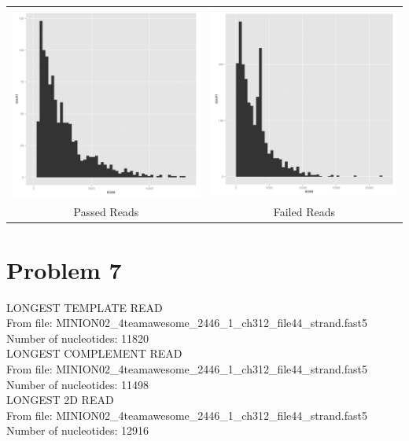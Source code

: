 \documentclass[11pt]{article}
\begin{document}
        
        \begin{tabular}{cc}
          \includegraphics[width=.48\textwidth]{histallpass}
          &
          \includegraphics[width=.48\textwidth]{histallfail}
          \\
          Passed Reads
          &
          Failed Reads
        \end{tabular}
\section*{Problem 7}

LONGEST TEMPLATE READ\\
From file: MINION02\_4teamawesome\_2446\_1\_ch312\_file44\_strand.fast5\\
Number of nucleotides: 11820\\

LONGEST COMPLEMENT READ\\
From file: MINION02\_4teamawesome\_2446\_1\_ch312\_file44\_strand.fast5\\
Number of nucleotides: 11498\\

LONGEST 2D READ\\
From file: MINION02\_4teamawesome\_2446\_1\_ch312\_file44\_strand.fast5\\
Number of nucleotides: 12916\\
\end{document}

